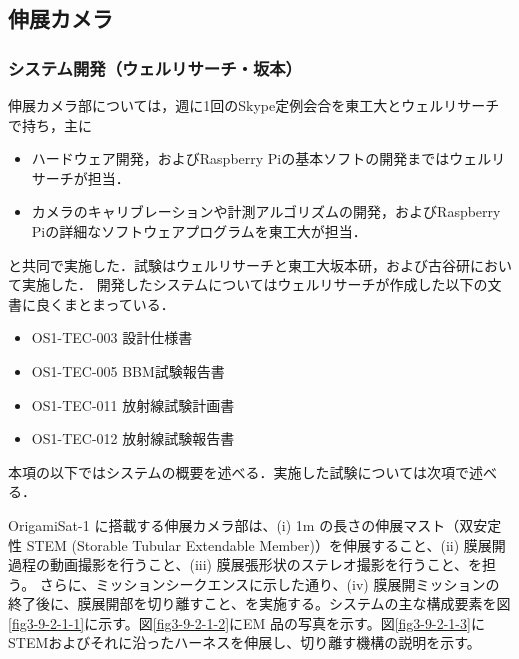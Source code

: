 \subsection{伸展カメラ}
\subsubsection{システム開発（ウェルリサーチ・坂本）}

伸展カメラ部については，週に1回のSkype定例会合を東工大とウェルリサーチで持ち，主に
\begin{itemize}
	\item ハードウェア開発，およびRaspberry Piの基本ソフトの開発まではウェルリサーチが担当．
	\item カメラのキャリブレーションや計測アルゴリズムの開発，およびRaspberry Piの詳細なソフトウェアプログラムを東工大が担当．
\end{itemize}
と共同で実施した．試験はウェルリサーチと東工大坂本研，および古谷研において実施した．
%
開発したシステムについてはウェルリサーチが作成した以下の文書に良くまとまっている．
\begin{itemize}
	\item OS1-TEC-003 設計仕様書
	\item OS1-TEC-005 BBM試験報告書
	\item OS1-TEC-011 放射線試験計画書
	\item OS1-TEC-012 放射線試験報告書
\end{itemize}
本項の以下ではシステムの概要を述べる．実施した試験については次項で述べる．

OrigamiSat-1 に搭載する伸展カメラ部は、(i) 1m の長さの伸展マスト（双安定性 STEM (Storable Tubular Extendable Member)）を伸展すること、(ii) 膜展開過程の動画撮影を行うこと、(iii) 膜展張形状のステレオ撮影を行うこと、を担う。
さらに、ミッションシークエンスに示した通り、(iv) 膜展開ミッションの終了後に、膜展開部を切り離すこと、を実施する。システムの主な構成要素を図\ref{fig3-9-2-1-1}に示す。図\ref{fig3-9-2-1-2}にEM 品の写真を示す。図\ref{fig3-9-2-1-3}にSTEMおよびそれに沿ったハーネスを伸展し、切り離す機構の説明を示す。

